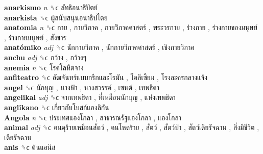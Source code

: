 \textbf{anarkismo} \emph{n}  ␝ϲ   ลัทธิอนาธิปัตย์   \\
\textbf{anarkista} ␝ϲ   ผู้สนับสนุนอนาธิปไตย   \\
\textbf{anatomia} \emph{n}  ␝ϲ   กาย ,  กายวิภาค ,  กายวิิภาคศาสตร์ ,  พระวรกาย ,  ร่างกาย ,  ร่างกายของมนุษย์ ,  ร่างกายมนุษย์ ,  สังขาร   \\
\textbf{anatómiko} \emph{adj}  ␝ϲ   นักกายวิภาค ,  นักกายวิภาคศาสตร์ ,  เชิงกายวิภาค   \\
\textbf{anchu} \emph{adj}  ␝ϲ   กว้าง ,  กว้างๆ   \\
\textbf{anemia} \emph{n}  ␝ϲ   โรคโลหิตจาง   \\
\textbf{anfiteatro} ␝ϲ   อัฒจันทร์แบบกรีกและโรมัน ,  โคลีเซียม ,  โรงละครกลางแจ้ง   \\
\textbf{angel} ␝ϲ   นักบุญ ,  นางฟ้า ,  นางสวรรค์ ,  เซนต์ ,  เทพธิดา   \\
\textbf{angelikal} \emph{adj}  ␝ϲ   จากเทพธิดา ,  ที่เหมือนนักบุญ ,  แห่งเทพธิดา   \\
\textbf{anglikano} ␝ϲ   เกี่ยวกับโบสถ์แองลิกัน   \\
\textbf{Angola} \emph{n}  ␝ϲ   ประเทศแองโกลา ,  สาธารณรัฐแองโกลา ,  แองโกลา   \\
\textbf{animal} \emph{adj}  ␝ϲ   คนดุร้ายเหมือนสัตว์ ,  คนโหดร้าย ,  สัตว์ ,  สัตว์ป่า ,  สัตว์เดียรัจฉาน ,  สิ่งมีชีวิต ,  เดียรัจฉาน   \\
\textbf{anis} ␝ϲ   ต้นแอนิส   \\
